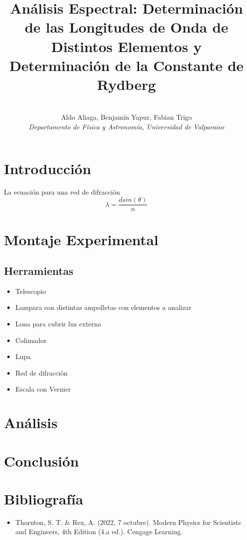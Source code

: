 \documentclass[a4paper,twocolumn,10pt]{article}
\begin{document}
\title{Análisis Espectral: Determinación de las Longitudes de Onda de Distintos Elementos y Determinación de la Constante de Rydberg}
\author{ \\Aldo Aliaga, Benjamín Yapur, Fabian Trigo \\ \textit{Departamento de Física y Astronomía, Universidad de Valparaiso}}

\vspace{2cm}

\section{Introducción}

La ecuación para una red de difracción
\begin{equation}
\lambda = \frac{d sin(\theta)}{n}    
\end{equation}

\section{Montaje Experimental}
\subsection{Herramientas}
\begin{itemize} 
\item Telescopio
\item Lampara con distintas ampolletas con elementos a analizar
\item Lona para cubrir luz externa
\item Colimador
\item Lupa
\item Red de difracción
\item Escala con Vernier
\end{itemize}
\section{Análisis}

\section{Conclusión}
\section{Bibliografía}


\begin{itemize}
\item Thornton, S. T. \& Rex, A. (2022, 7 octubre). Modern Physics for Scientists and Engineers, 4th Edition (4.a ed.). Cengage Learning.
\end{itemize}
\end{document}
